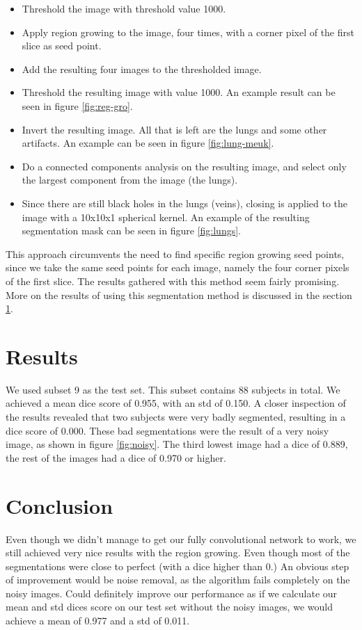 \documentclass[a4paper,10pt]{article}
\numberwithin{equation}{section} %
\numberwithin{figure}{section} %
\numberwithin{table}{section} %
\begin{document}
\begin{itemize}
\item Threshold the image with threshold value 1000.
\item Apply region growing to the image, four times, with a corner pixel of the first slice as seed point.
\item Add the resulting four images to the thresholded image.
\item Threshold the resulting image with value 1000. An example result can be seen in figure \ref{fig:reg-gro}.
\item Invert the resulting image. All that is left are the lungs and some other artifacts. An example can be seen in figure \ref{fig:lung-meuk}.
\item Do a connected components analysis on the resulting image, and select only the largest component from the image (the lungs).
\item Since there are still black holes in the lungs (veins), closing is applied to the image with a 10x10x1 spherical kernel. An example of the resulting segmentation mask can be seen in figure \ref{fig:lungs}.
\end{itemize}

\noindent This approach circumvents the need to find specific region growing seed points, since we take the same seed points for each image, namely the four corner pixels of the first slice. The results gathered with this method seem fairly promising. More on the results of using this segmentation method is discussed in the section \ref{sec:results}.


\section{Results}
\label{sec:results}
We used subset 9 as the test set. This subset contains 88 subjects in total. We achieved a mean dice score of 0.955, with an std of 0.150. A closer inspection of the results revealed that two subjects were very badly segmented, resulting in a dice score of 0.000. These bad segmentations were the result of a very noisy image, as shown in figure \ref{fig:noisy}. The third lowest image had a dice of 0.889, the rest of the images had a dice of 0.970 or higher. 

\section{Conclusion}
Even though we didn't manage to get our fully convolutional network to work, we still achieved very nice results with the region growing. Even though most of the segmentations were close to perfect (with a dice higher than 0.) An obvious step of improvement would be noise removal, as the algorithm fails completely on the noisy images. Could definitely improve our performance as if we calculate our mean and std dices score on our test set without the noisy images, we would achieve a mean of 0.977 and a std of 0.011.
\end{document}
